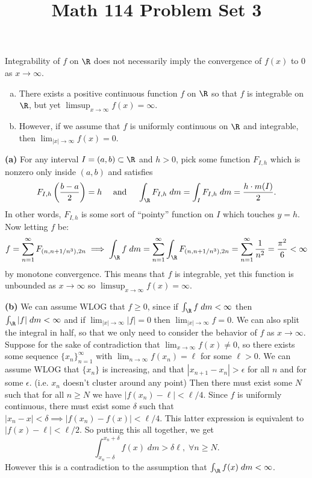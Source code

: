 \documentclass[11pt,letterpaper]{article}
\title{\textbf{Math 114 Problem Set 3}}
\begin{document}
\maketitle

\begin{cproblem}{6} Integrability of $f$ on $\R$ does not necessarily imply the convergence of $f(x)$ to $0$ as $x \to \infty$.
    \begin{enumerate}[(a)]
        \item There exists a positive continuous function $f$ on $\R$ so that $f$ is integrable on $\R$, but yet $\limsup_{x\to\infty}f(x) = \infty$.
        \item However, if we assume that $f$ is uniformly continuous on $\R$ and integrable, then $\lim_{|x|\to \infty}f(x) = 0$.
    \end{enumerate}
\end{cproblem}

\begin{solution}
    \textbf{(a)} For any interval $I=(a,b)\subset \R$ and $h>0$, pick some function $F_{I,h}$ which is nonzero only inside $(a,b)$ and satisfies
    \[
        F_{I,h}\left(\frac{b-a}{2}\right)=h\quad\textrm{ and }\quad \int_\R F_{I,h}\;dm = \int_I F_{I,h}\;dm = \frac{h\cdot m(I)}{2}
    .\]
    In other words, $F_{I,h}$ is some sort of ``pointy'' function on $I$ which touches $y=h$. Now letting $f$ be:
    \[
        f = \sum^\infty_{n=1} F_{(n,n+1 /n^3), 2n} \implies \int_\R f \;dm = \sum_{n=1}^\infty \int_\R F_{(n,n+1 /n^3), 2n} = \sum_{n=1}^\infty \frac{1}{n^2}=\frac{\pi^2}{6}<\infty
    \]
    by monotone convergence. This means that $f$ is integrable, yet this function is unbounded as $x\to\infty$ so $\limsup_{x\to\infty} f(x)=\infty$.

    \textbf{(b)} We can assume WLOG that $f\geq 0$, since if $\int_\R f\;dm<\infty$ then $\int_\R |f|\; dm<\infty$ and if $\lim_{|x|\to \infty}|f|=0$ then $\lim_{|x|\to \infty} f = 0$. We can also split the integral in half, so that we only need to consider the behavior of $f$ as $x\to \infty$. Suppose for the sake of contradiction that $\lim_{x\to \infty} f(x)\neq 0$, so there exists some sequence $\{x_n\}^\infty_{n=1}$ with $\lim_{n\to \infty}f(x_n)=\ell$ for some $\ell> 0$. We can assume WLOG that $\{x_n\}$ is increasing, and that $|x_{n+1}-x_n|>\epsilon$ for all $n$ and for some $\epsilon$. (i.e. $x_n$ doesn't cluster around any point) Then there must exist some $N$ such that for all $n\geq N$ we have $|f(x_n)-\ell|<\ell /4$. Since $f$ is uniformly continuous, there must exist some $\delta$ such that $|x_n-x|<\delta\implies |f(x_n)-f(x)|<\ell /4$. This latter expression is equivalent to $|f(x)-\ell|<\ell /2$. So putting this all together, we get
    \[
        \int^{x_n+\delta}_{x_n-\delta} f(x)\;dm>\delta \ell,\; \forall n\geq N
    .\]
    However this is a contradiction to the assumption that $\int_\R f(x)\;dm<\infty$.
\end{solution}
\end{document}
